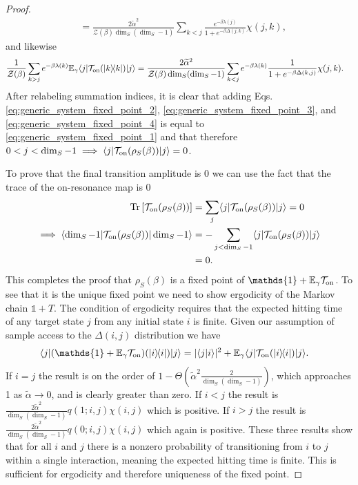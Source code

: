 \documentclass{article}
\newcommand{\on}{\rm on}
\newcommand{\ket}[1]{|#1\rangle}
\newcommand{\bra}[1]{\langle #1|}
\newcommand{\braket}[2]{\langle #1|#2\rangle}
\newcommand{\ketbra}[2]{| #1\rangle\! \langle #2|}
\newcommand{\brackets}[1]{\left[ #1 \right]}
\DeclareMathOperator{\Tr}{Tr}
\newcommand{\trace}[1]{\Tr \brackets{ #1 }}
\newcommand{\partfun}{\mathcal{Z}}
\newcommand{\identity}{\mathds{1}}
\begin{document}
\begin{proof}
\begin{align}
    &= \frac{2 \widetilde{\alpha}^2 }{\partfun(\beta) \dim_S(\dim_S - 1) } \sum_{k < j} \frac{e^{-\beta \lambda(j)}}{1 + e^{-\beta \Delta(j, k)}} \chi(j, k), \label{eq:generic_system_fixed_point_3}
\end{align}
and likewise
\begin{align}
    \frac{1}{\partfun(\beta)} \sum_{k > j} e^{-\beta \lambda(k)} \mathbb{E}_{\gamma} \bra{j} \mathcal{T}_{\on}(\ketbra{k}{k}) \ket{j} &= \frac{2 \widetilde{\alpha}^2 }{\partfun(\beta) \dim_S(\dim_S - 1) } \sum_{k < j} e^{-\beta \lambda(k)} \frac{1}{1 + e^{-\beta \Delta(k, j)}} \chi(j, k). \label{eq:generic_system_fixed_point_4}
\end{align}
After relabeling summation indices, it is clear that adding Eqs. \eqref{eq:generic_system_fixed_point_2}, \eqref{eq:generic_system_fixed_point_3}, and \eqref{eq:generic_system_fixed_point_4} is equal to \eqref{eq:generic_system_fixed_point_1} and that therefore $0 < j < \dim_S - 1 \implies \bra{j} \mathcal{T}_{\on}(\rho_S(\beta)) \ket{j} = 0$.

To prove that the final transition amplitude is 0 we can use the fact that the trace of the on-resonance map is 0
\begin{align}
    \trace{\mathcal{T}_{\on}(\rho_S(\beta))} &= \sum_j \bra{j} \mathcal{T}_{\on}(\rho_S(\beta)) \ket{j} = 0\\
    \implies \bra{\dim_S - 1} \mathcal{T}_{\on}(\rho_S(\beta)) \ket{\dim_S - 1} &= - \sum_{j < \dim_S - 1} \bra{j} \mathcal{T}_{\on}(\rho_S(\beta)) \ket{j} \\ 
    &= 0.
\end{align}
This completes the proof that $\rho_S(\beta)$ is a fixed point of $\identity + \mathbb{E}_{\gamma} \mathcal{T}_{\on}$. To see that it is the unique fixed point we need to show ergodicity of the Markov chain $\identity + T$. The condition of ergodicity requires that the expected hitting time of any target state $j$ from any initial state $i$ is finite. Given our assumption of sample access to the $\Delta(i,j)$ distribution we have 
\begin{align}
    \bra{j} (\identity + \mathbb{E}_{\gamma} \mathcal{T}_{\on})(\ketbra{i}{i}) \ket{j} &= |\braket{j}{i}|^2 + \mathbb{E}_{\gamma} \bra{j} \mathcal{T}_{\on} (\ketbra{i}{i}) \ket{j}.
\end{align}
If $i = j$ the result is on the order of $1 - \Theta(\widetilde{\alpha}^2 \frac{2}{\dim_S (\dim_S - 1)})$, which approaches 1 as $\widetilde{\alpha} \to 0$, and is clearly greater than zero. If $i < j$ the result is $\frac{2 \widetilde{\alpha}^2}{\dim_S (\dim_S - 1)} q(1; i,j) \chi(i,j)$ which is positive. If $i > j$ the result is $\frac{2 \widetilde{\alpha}^2}{\dim_S (\dim_S - 1)} q(0; i,j) \chi(i,j)$ which again is positive. These three results show that for all $i$ and $j$ there is a nonzero probability of transitioning from $i$ to $j$ within a single interaction, meaning the expected hitting time is finite. This is sufficient for ergodicity and therefore uniqueness of the fixed point.


\end{proof}
\end{document}
